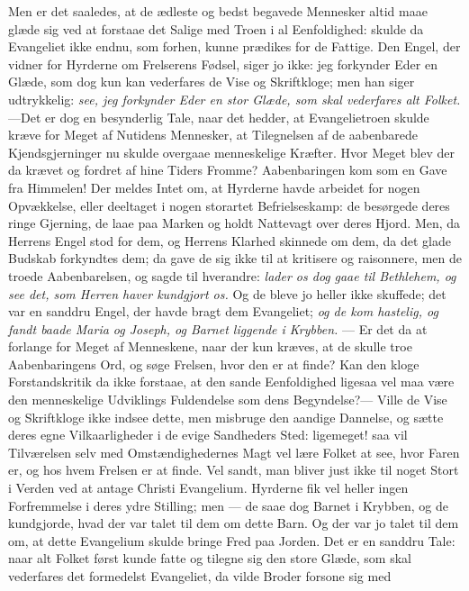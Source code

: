 \documentclass[12pt,a4paper]{book}
\begin{document}
Men er det saaledes, at de ædleste og bedst begavede Mennesker altid maae glæde
sig ved at forstaae det Salige med Troen i al Eenfoldighed: skulde da
Evangeliet ikke endnu, som forhen, kunne prædikes for de Fattige. Den Engel, der
vidner for Hyrderne om Frelserens Fødsel, siger jo ikke: jeg forkynder Eder en
Glæde, som dog kun kan vederfares de Vise og Skriftkloge; men han siger
udtrykkelig: \emph{see, jeg forkynder Eder en stor Glæde, som skal vederfares alt
Folket.}---Det er dog en besynderlig Tale, naar det hedder, at Evangelietroen
skulde kræve for Meget af Nutidens Mennesker, at Tilegnelsen af de aabenbarede
Kjendsgjerninger nu skulde overgaae menneskelige Kræfter. Hvor Meget blev der da
krævet og fordret af hine Tiders Fromme? Aabenbaringen kom som en Gave fra
Himmelen! Der meldes Intet om, at Hyrderne havde arbeidet for nogen Opvækkelse,
eller deeltaget i nogen storartet Befrielseskamp: de besørgede deres ringe
Gjerning, de laae paa Marken og holdt Nattevagt over deres Hjord. Men, da
Herrens Engel stod for dem, og Herrens Klarhed skinnede om dem, da det glade
Budskab forkyndtes dem; da gave de sig ikke til at kritisere og raisonnere, men
de troede Aabenbarelsen, og sagde til hverandre: \emph{lader os dog}
\emph{gaae til Bethlehem, og see det, som Herren haver kundgjort os.} Og de bleve
jo heller ikke skuffede; det var en sanddru Engel, der havde bragt dem
Evangeliet; \emph{og de kom hastelig, og fandt baade Maria og Joseph, og Barnet
liggende i Krybben.} --- Er det da at forlange for Meget af Menneskene, naar der
kun kræves, at de skulle troe Aabenbaringens Ord, og søge Frelsen, hvor den er at
finde? Kan den kloge Forstandskritik da ikke forstaae, at den sande Eenfoldighed
ligesaa vel maa være den menneskelige Udviklings Fuldendelse som dens
Begyndelse?--- Ville de Vise og Skriftkloge ikke indsee dette, men misbruge den
aandige Dannelse, og sætte deres egne Vilkaarligheder i de evige Sandheders Sted:
ligemeget! saa vil Tilværelsen selv med Omstændighedernes Magt vel lære Folket at
see, hvor Faren er, og hos hvem Frelsen er at finde. Vel sandt, man bliver just
ikke til noget Stort i Verden ved at antage Christi Evangelium. Hyrderne fik vel
heller ingen Forfremmelse i deres ydre Stilling; men --- de saae dog Barnet i
Krybben, og de kundgjorde, hvad der var talet til dem om dette Barn. Og der var
jo talet til dem om, at dette Evangelium skulde bringe Fred paa Jorden. Det er en
sanddru Tale: naar alt Folket først kunde fatte og tilegne sig den store Glæde,
som skal vederfares det formedelst Evangeliet, da vilde Broder forsone sig med
\end{document}
